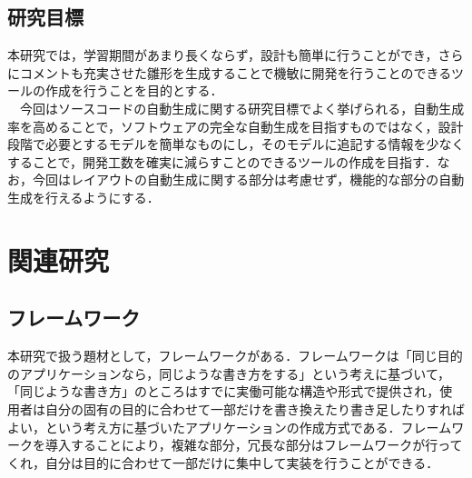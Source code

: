 \documentclass{funthesis}
\begin{document}
\section{研究目標}

本研究では，学習期間があまり長くならず，設計も簡単に行うことができ，さらにコメントも充実させた雛形を生成することで機敏に開発を行うことのできるツールの作成を行うことを目的とする．\\
　今回はソースコードの自動生成に関する研究目標でよく挙げられる，自動生成率を高めることで，ソフトウェアの完全な自動生成を目指すものではなく，設計段階で必要とするモデルを簡単なものにし，そのモデルに追記する情報を少なくすることで，開発工数を確実に減らすことのできるツールの作成を目指す．なお，今回はレイアウトの自動生成に関する部分は考慮せず，機能的な部分の自動生成を行えるようにする．

\chapter{関連研究}

\section{フレームワーク}
本研究で扱う題材として，フレームワークがある．フレームワークは「同じ目的のアプリケーションなら，同じような書き方をする」という考えに基づいて，「同じような書き方」のところはすでに実働可能な構造や形式で提供され，使用者は自分の固有の目的に合わせて一部だけを書き換えたり書き足したりすればよい\cite{ruby2}，という考え方に基づいたアプリケーションの作成方式である．フレームワークを導入することにより，複雑な部分，冗長な部分はフレームワークが行ってくれ，自分は目的に合わせて一部だけに集中して実装を行うことができる．
\end{document}
